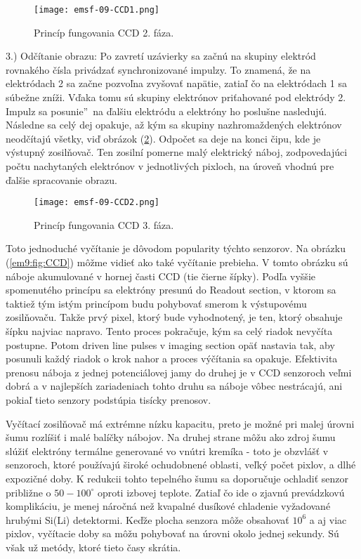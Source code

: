 \documentclass[../../main.tex]{subfiles}
\begin{document}
\begin{figure}[!h]
\texttt{[image: emsf-09-CCD1.png]}
\centering
\caption{Princíp fungovania CCD 2. fáza.}
\label{em9:fig:CCD1}
\end{figure}

3.) Odčítanie obrazu: Po zavretí uzávierky sa začnú na skupiny elektród rovnakého čísla privádzať synchronizované impulzy. To znamená, že na elektródach 2 sa začne pozvoľna zvyšovať napätie, zatiaľ čo na elektródach 1 sa súbežne zníži. Vďaka tomu sú skupiny elektrónov priťahované pod elektródy 2. Impulz sa \quotedblbase posunie\textquotedblright ~na ďalšiu elektródu a elektróny ho poslušne nasledujú. Následne sa celý dej opakuje, až kým sa skupiny nazhromaždených elektrónov neodčítajú všetky, viď obrázok (\ref{em9:fig:CCD2}). Odpočet sa deje na konci čipu, kde je výstupný zosilňovač. Ten zosilní pomerne malý elektrický náboj, zodpovedajúci počtu nachytaných elektrónov v jednotlivých pixloch, na úroveň vhodnú pre ďalšie spracovanie obrazu.

\begin{figure}[!h]
\texttt{[image: emsf-09-CCD2.png]}
\centering
\caption{Princíp fungovania CCD 3. fáza.}
\label{em9:fig:CCD2}
\end{figure}

Toto jednoduché vyčítanie je dôvodom popularity týchto senzorov. Na obrázku (\ref{em9:fig:CCD}) môžme vidieť ako také vyčítanie prebieha. V tomto obrázku sú náboje akumulované v hornej časti CCD (tie čierne šípky). Podľa vyššie spomenutého princípu sa elektróny presunú do Readout section, v ktorom sa taktiež tým istým princípom budu pohybovať smerom k výstupovému zosilňovaču. Takže prvý pixel, ktorý bude vyhodnotený, je ten, ktorý obsahuje šípku najviac napravo. Tento proces pokračuje, kým sa celý riadok nevyčíta postupne. Potom driven line pulses v imaging section opäť nastavia tak, aby posunuli každý riadok o krok nahor a proces výčítania sa opakuje. Efektivita prenosu náboja z jednej potenciálovej jamy do druhej je v CCD senzoroch veľmi dobrá a v najlepších zariadeniach tohto druhu sa náboje vôbec nestrácajú, ani pokiaľ tieto senzory podstúpia tisícky prenosov.

Vyčítací zosilňovač má extrémne nízku kapacitu, preto je možné pri malej úrovni šumu rozlíšiť i malé balíčky nábojov. Na druhej strane môžu ako zdroj šumu slúžiť elektróny termálne generované vo vnútri kremíka - toto je obzvlášť v senzoroch, ktoré používajú široké ochudobnené oblasti, veľký počet pixlov, a dlhé expozičné doby. K redukcii tohto tepelného šumu sa doporučuje ochladiť senzor približne o $50-100^{\circ}$ oproti izbovej teplote. Zatiaľ čo ide o zjavnú prevádzkovú komplikáciu, je menej náročná než kvapalné dusíkové chladenie vyžadované hrubými Si(Li) detektormi. Keďže plocha senzora môže obsahovať $10^6$ a aj viac pixlov, vyčítacie doby sa môžu pohybovať na úrovni okolo jednej sekundy. Sú však už metódy, ktoré tieto časy skrátia.
\end{document}

